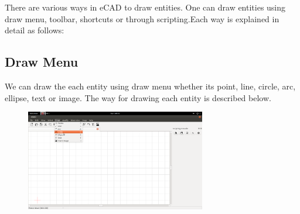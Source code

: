 There are various ways in eCAD to draw entities. One can draw entities using draw menu, toolbar, shortcuts or through scripting.Each way is explained in detail as follows:
\subsection{Draw Menu}
We can draw the each entity using draw menu whether its point, line, circle, arc, ellipse, text or image. The way for drawing each entity is described below.
\begin{figure}[h!]
\centering
\includegraphics[width=0.7\textwidth]{images/drawmenu.png}\\
\end{figure}
